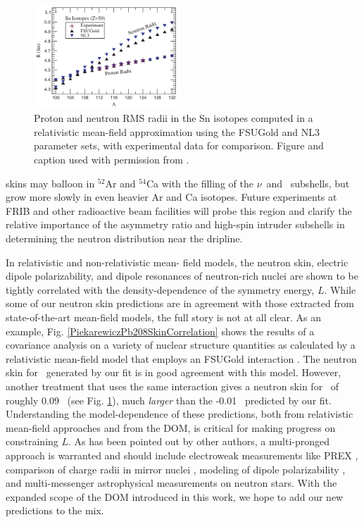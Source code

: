 \begin{figure}
    \centering
    \includegraphics[width=0.48\textwidth]{figures/Piekarewicz2006SnIsotopes.png}
    \caption[Proton and neutron RMS radii in the Sn isotopes computed with FSUGold and NL3
    interactions]
    {
        Proton and neutron RMS radii in the Sn isotopes computed in a relativistic mean-field
        approximation using the FSUGold and NL3 parameter sets, with experimental data for comparison.
        Figure and caption used with permission from \cite{Piekarewicz2006}.
    }
    \label{Piekarewicz2006SnIsotopes}
\end{figure}
skins may balloon in $^{52}$Ar and $^{54}$Ca
with the filling of the $\nu$\fSeven\ and \fFive\ subshells, but grow more slowly
in even heavier Ar and Ca isotopes. Future experiments at FRIB and other
radioactive beam facilities will probe this region and clarify the relative
importance of the asymmetry ratio and high-spin intruder subshells in determining
the neutron distribution near the dripline.

In relativistic and non-relativistic mean-
field models, the neutron skin,
electric dipole
polarizability, and dipole resonances of neutron-rich nuclei are
shown to be tightly correlated with the density-dependence of the symmetry
energy, $L$.
While some of our neutron skin predictions are in agreement with those extracted
from state-of-the-art mean-field models, the
full story is not at all clear.
As an example, Fig. \ref{PiekarewiczPb208SkinCorrelation}
shows the results of a covariance analysis on a variety of nuclear structure
quantities as calculated by a relativistic mean-field model 
that employs an FSUGold interaction \cite{Fattoyev2012}.
The neutron
skin for \pbEight\ generated by our fit is in good agreement with this model.
However, another treatment that uses the same interaction
\cite{Piekarewicz2006} gives a neutron skin for \snTwelve\ of roughly 0.09
\femto\meter\ (see Fig. \ref{Piekarewicz2006SnIsotopes}), much \textit{larger} than the
-0.01 \femto\meter\ predicted by our fit.
Understanding the model-dependence of these predictions, both from relativistic mean-field
approaches and from the DOM, is critical for making progress on constraining
$L$. As has been pointed out by other authors, a multi-pronged approach 
is warranted and should include electroweak measurements like PREX \cite{Horowitz2014}, comparison of
charge radii in mirror nuclei \cite{Brown2017}, modeling of dipole
polarizability \cite{Piekarewicz2006}, and multi-messenger astrophysical
measurements on neutron stars. With the expanded scope of the DOM introduced in
this work, we hope to add our new predictions to the mix.

